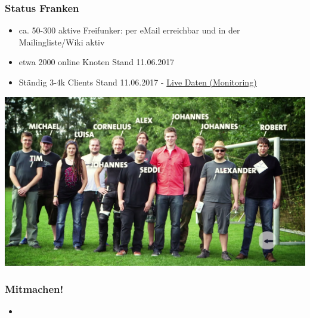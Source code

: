 \begin{frame}
\frametitle{Status Franken}
	\begin{itemize}
		\item ca. 50-300 aktive Freifunker: per eMail erreichbar und in der Mailingliste/Wiki aktiv
		\item etwa 2000 online Knoten
			\begingroup 
				\tiny{Stand 11.06.2017}
			\endgroup
		\item Ständig 3-4k Clients  
			\begingroup 
				\tiny{Stand 11.06.2017 - \href{https://monitoring.freifunk-franken.de/statistics}{Live Daten (Monitoring)}}
			\endgroup
	\end{itemize}
	\includegraphics[width=\textwidth]{images/community.jpg}
\end{frame}

\begin{frame}
\frametitle{Mitmachen!}
	\begin{itemize}
		\item 
	\end{itemize}
\end{frame}
